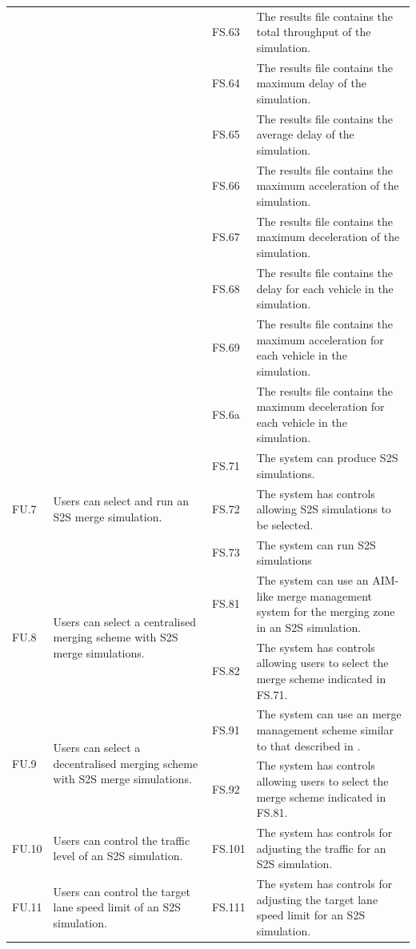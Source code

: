 \begin{longtable}{|p{0.1\linewidth}|p{0.4\linewidth}|p{0.1\linewidth}|p{0.4\linewidth}|}
 &  & FS.63 & The results file contains the total throughput of the simulation. \\
 &  & FS.64 & The results file contains the maximum delay of the simulation. \\
 &  & FS.65 & The results file contains the average delay of the simulation. \\
 &  & FS.66 & The results file contains the maximum acceleration of the simulation. \\
 &  & FS.67 & The results file contains the maximum deceleration of the simulation. \\
 &  & FS.68 & The results file contains the delay for each vehicle in the simulation. \\
 &  & FS.69 & The results file contains the maximum acceleration for each vehicle in the simulation. \\
 &  & FS.6a & The results file contains the maximum deceleration for each vehicle in the simulation. \\ 
\hline
\multirow{3}{*}{FU.7} & \multirow{3}{*}{\parbox{\linewidth}{Users can select and run an S2S merge simulation.}}
 & FS.71 & The system can produce S2S simulations. \\
 &  & FS.72 & The system has controls allowing S2S simulations to be selected. \\
 &  & FS.73 & The system can run S2S simulations \\ 
\hline
\multirow{2}{*}{FU.8} & \multirow{2}{*}{\parbox{\linewidth}{Users can select a centralised merging scheme with S2S merge simulations.}}
 & FS.81 & The system can use an AIM-like merge management system for the merging zone in an S2S simulation. \\
 &  & FS.82 & The system has controls allowing users to select the merge scheme indicated in FS.71. \\ 
\hline
\multirow{2}{*}{FU.9} & \multirow{2}{*}{\parbox{\linewidth}{Users can select a decentralised merging scheme with S2S merge simulations.}}
 & FS.91 & The system can use an merge management scheme similar to that described in \citep{VanMiddlesworth2008}. \\
 &  & FS.92 & The system has controls allowing users to select the merge scheme indicated in FS.81. \\ 
\hline
FU.10 & Users can control the traffic level of an S2S simulation. & FS.101 & The system has controls for adjusting the traffic for an S2S simulation. \\ 
\hline
FU.11 & Users can control the target lane speed limit of an S2S simulation. & FS.111 & The system has controls for adjusting the target lane speed limit for an S2S simulation. \\ 

\end{longtable}
